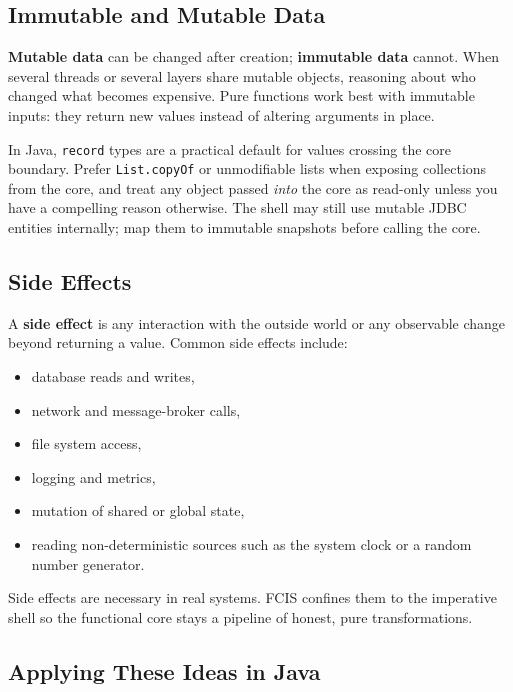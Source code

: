 \subsection{Immutable and Mutable Data}
\label{sec:fcis_immutable_mutable}

\textbf{Mutable data} can be changed after creation; \textbf{immutable data} cannot. When several threads or several layers share mutable objects, reasoning about who changed what becomes expensive. Pure functions work best with immutable inputs: they return new values instead of altering arguments in place.

In Java, \texttt{record} types are a practical default for values crossing the core boundary. Prefer \texttt{List.copyOf} or unmodifiable lists when exposing collections from the core, and treat any object passed \textit{into} the core as read-only unless you have a compelling reason otherwise. The shell may still use mutable JDBC entities internally; map them to immutable snapshots before calling the core.

\subsection{Side Effects}
\label{sec:fcis_side_effects}

A \textbf{side effect} is any interaction with the outside world or any observable change beyond returning a value. Common side effects include:
\begin{itemize}
    \item database reads and writes,
    \item network and message-broker calls,
    \item file system access,
    \item logging and metrics,
    \item mutation of shared or global state,
    \item reading non-deterministic sources such as the system clock or a random number generator.
\end{itemize}
Side effects are necessary in real systems. FCIS confines them to the imperative shell so the functional core stays a pipeline of honest, pure transformations.

\subsection{Applying These Ideas in Java}
\label{sec:fcis_java_guidance}

